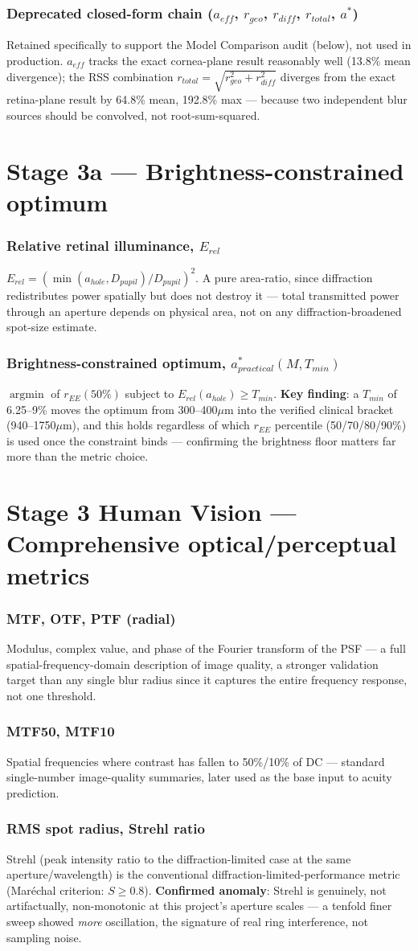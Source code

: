 \documentclass[10pt]{report}
\newcommand{\feat}[1]{\subsection*{#1}}
\begin{document}
\feat{Deprecated closed-form chain ($a_{eff}$, $r_{geo}$, $r_{diff}$, $r_{total}$, $a^*$)}
Retained specifically to support the Model Comparison audit (below), not used in production. $a_{eff}$ tracks the exact cornea-plane result reasonably well (13.8\% mean divergence); the RSS combination $r_{total}=\sqrt{r_{geo}^2+r_{diff}^2}$ diverges from the exact retina-plane result by 64.8\% mean, 192.8\% max --- because two independent blur sources should be convolved, not root-sum-squared.

\chapter{Stage 3a --- Brightness-constrained optimum}
\feat{Relative retinal illuminance, $E_{rel}$}
$E_{rel} = (\min(a_{hole},D_{pupil})/D_{pupil})^2$. A pure area-ratio, since diffraction redistributes power spatially but does not destroy it --- total transmitted power through an aperture depends on physical area, not on any diffraction-broadened spot-size estimate.

\feat{Brightness-constrained optimum, $a^*_{practical}(M,T_{min})$}
$\operatorname{argmin}$ of $r_{EE}(50\%)$ subject to $E_{rel}(a_{hole})\ge T_{min}$. \textbf{Key finding}: a $T_{min}$ of 6.25--9\% moves the optimum from 300--400$\mu$m into the verified clinical bracket (940--1750$\mu$m), and this holds regardless of which $r_{EE}$ percentile (50/70/80/90\%) is used once the constraint binds --- confirming the brightness floor matters far more than the metric choice.

\chapter{Stage 3 Human Vision --- Comprehensive optical/perceptual metrics}
\feat{MTF, OTF, PTF (radial)}
Modulus, complex value, and phase of the Fourier transform of the PSF --- a full spatial-frequency-domain description of image quality, a stronger validation target than any single blur radius since it captures the entire frequency response, not one threshold.

\feat{MTF50, MTF10}
Spatial frequencies where contrast has fallen to 50\%/10\% of DC --- standard single-number image-quality summaries, later used as the base input to acuity prediction.

\feat{RMS spot radius, Strehl ratio}
Strehl (peak intensity ratio to the diffraction-limited case at the same aperture/wavelength) is the conventional diffraction-limited-performance metric (Mar\'echal criterion: $S\ge0.8$). \textbf{Confirmed anomaly}: Strehl is genuinely, not artifactually, non-monotonic at this project's aperture scales --- a tenfold finer sweep showed \emph{more} oscillation, the signature of real ring interference, not sampling noise.
\end{document}
